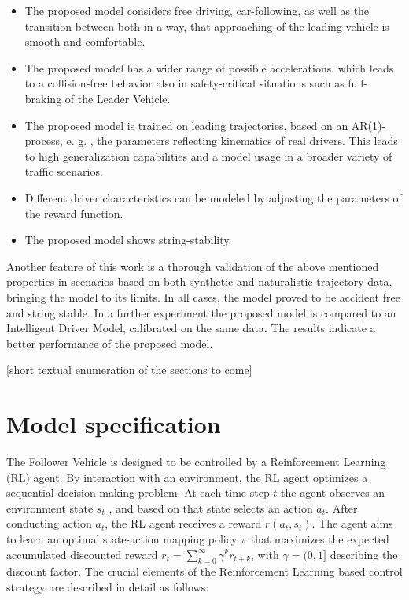 \documentclass[review]{elsarticle}
\begin{document}
\begin{itemize}
	\item  The proposed model considers free driving, car-following, as well as the transition between both in a way, that approaching of the leading vehicle is smooth and comfortable.
	\item The proposed model has a wider range of possible accelerations, which leads to a collision-free behavior also in safety-critical situations such as full-braking of the Leader Vehicle.
	\item The proposed model is trained on leading trajectories, based on an AR(1)-process, e. g. \cite{HonerkampEngl}, the parameters reflecting kinematics of real drivers. This leads to high generalization capabilities and a model usage in a broader variety of traffic scenarios. 
	\item Different driver characteristics can be modeled by adjusting the parameters of the reward function.
	\item The proposed model shows string-stability.
	
\end{itemize}

Another feature of this work is a thorough validation of the above mentioned properties in scenarios based on both synthetic and naturalistic trajectory data, bringing the model to its limits. 
In all cases, the model proved to be accident free and string stable.
In a further experiment the proposed model is compared to an Intelligent Driver Model, calibrated on the same data. The results indicate a better performance of the proposed model.


[short textual enumeration of the sections to come]

\section{Model specification}
The Follower Vehicle is designed to be controlled by a Reinforcement Learning (RL) agent. By interaction with an environment, the RL agent optimizes a sequential decision making problem. At each time step $t$ the agent observes an environment state $s_t$ , and based on that state selects an action $a_t$. After conducting action $a_t$, the RL agent receives a reward $r(a_t,s_t)$. The agent aims to learn an optimal state-action mapping policy $\pi$ that maximizes the expected accumulated discounted reward $r_{t}=\sum_{k=0}^{\infty} \gamma^{k} r_{t+k}$, with $\gamma = (0,1]$ describing the discount factor. The crucial elements
of the Reinforcement Learning based control strategy are described
in detail as follows:
\end{document}
